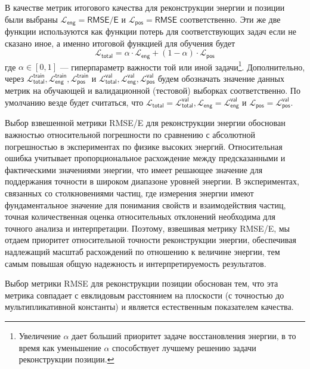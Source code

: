 \documentclass[a4paper,12pt]{extarticle}
\begin{document}
В качестве метрик итогового качества для реконструкции энергии и позиции были выбраны $\mathcal{L}_{\mathsf{eng}} = \textsf{RMSE/E}$ и $\mathcal{L}_{\mathsf{pos}} = \textsf{RMSE}$ соответственно. Эти же две функции используются как функции потерь для соответствующих задач если не сказано иное, а именно итоговой функцией для обучения будет \begin{equation}\label{eq:loss_total}
    \mathcal{L}_{\mathsf{total}} = \alpha \cdot \mathcal{L}_{\mathsf{eng}} + (1 - \alpha) \cdot \mathcal{L}_{\mathsf{pos}}
\end{equation} где $\alpha \in [0, 1]$ --- гиперпараметр важности той или иной задачи\footnote{Увеличение $\alpha$ дает больший приоритет задаче восстановления энергии, в то время как уменьшение $\alpha$ способствует лучшему решению задачи реконструкции позиции.}. Дополнительно, через $\mathcal{L}_{\mathsf{total}}^{\mathsf{train}}, \mathcal{L}_{\mathsf{eng}}^{\mathsf{train}}, \mathcal{L}_{\mathsf{pos}}^{\mathsf{train}}$ и $\mathcal{L}_{\mathsf{total}}^{\mathsf{val}}, \mathcal{L}_{\mathsf{eng}}^{\mathsf{val}}, \mathcal{L}_{\mathsf{pos}}^{\mathsf{val}}$ будем обозначать значение данных метрик на обучающей и валидационной (тестовой) выборках соответственно. По умолчанию везде будет считаться, что $\mathcal{L}_{\mathsf{total}} = \mathcal{L}_{\mathsf{total}}^{\mathsf{val}}, \mathcal{L}_{\mathsf{eng}} = \mathcal{L}_{\mathsf{eng}}^{\mathsf{val}}$ и $\mathcal{L}_{\mathsf{pos}} = \mathcal{L}_{\mathsf{pos}}^{\mathsf{val}}$.

Выбор взвешенной метрики \textsf{RMSE/E} для реконструкции энергии обоснован важностью относительной погрешности по сравнению с абсолютной погрешностью в экспериментах по физике высоких энергий. Относительная ошибка учитывает пропорциональное расхождение между предсказанными и фактическими значениями энергии, что имеет решающее значение для поддержания точности в широком диапазоне уровней энергии. В экспериментах, связанных со столкновениями частиц, где измерения энергии имеют фундаментальное значение для понимания свойств и взаимодействия частиц, точная количественная оценка относительных отклонений необходима для точного анализа и интерпретации. Поэтому, взвешивая метрику \textsf{RMSE/E}, мы отдаем приоритет относительной точности реконструкции энергии, обеспечивая надлежащий масштаб расхождений по отношению к величине энергии, тем самым повышая общую надежность и интерпретируемость результатов.

Выбор метрики \textsf{RMSE} для реконструкции позиции обоснован тем, что эта метрика совпадает с евклидовым расстоянием на плоскости (с точностью до мультипликативной константы) и является естественным показателем качества.
\end{document}
